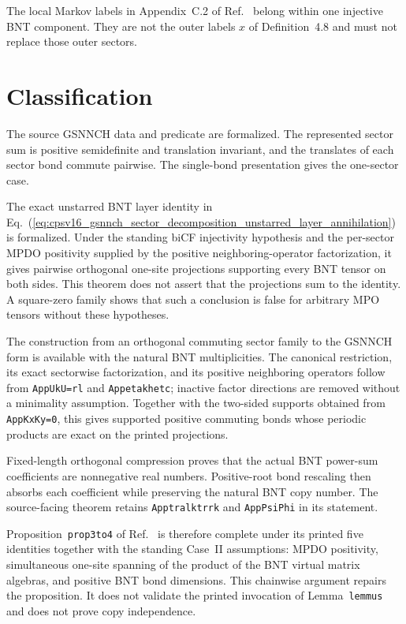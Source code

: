 \documentclass{article}
\begin{document}
The local Markov labels in Appendix~C.2 of
Ref.~\cite{Cirac2016MPDO_arXiv} belong within one injective BNT component.
They are not the outer labels $x$ of Definition~4.8 and must not replace those
outer sectors.

\section{Classification}

The source GSNNCH data and predicate are formalized. The represented sector
sum is positive semidefinite and translation invariant, and the translates
of each sector bond commute pairwise. The single-bond presentation gives the
one-sector case.

The exact unstarred BNT layer identity in
Eq.~(\ref{eq:cpsv16_gsnnch_sector_decomposition_unstarred_layer_annihilation})
is formalized. Under the standing biCF injectivity hypothesis and the
per-sector MPDO positivity supplied by the positive neighboring-operator
factorization, it gives pairwise orthogonal one-site projections supporting
every BNT tensor on both sides. This theorem does not assert that the
projections sum to the identity. A square-zero family shows that such a
conclusion is false for arbitrary MPO tensors without these hypotheses.

The construction from an orthogonal commuting sector family to the GSNNCH
form is available with the natural BNT multiplicities. The canonical
restriction, its exact sectorwise factorization, and its positive neighboring
operators follow from \texttt{AppUkU=rl} and \texttt{Appetakhetc}; inactive
factor directions are removed without a minimality assumption. Together with
the two-sided supports obtained from \texttt{AppKxKy=0}, this gives supported
positive commuting bonds whose periodic products are exact on the printed
projections.

Fixed-length orthogonal compression proves that the actual BNT power-sum
coefficients are nonnegative real numbers. Positive-root bond rescaling then
absorbs each coefficient while preserving the natural BNT copy number. The
source-facing theorem retains \texttt{Apptralktrrk} and \texttt{AppPsiPhi} in
its statement.

Proposition~\texttt{prop3to4} of Ref.~\cite{Cirac2016MPDO_arXiv} is therefore
complete under its printed five identities together with the standing Case~II
assumptions: MPDO positivity, simultaneous one-site spanning of the product of
the BNT virtual matrix algebras, and positive BNT bond dimensions. This
chainwise argument repairs the proposition. It does not validate the printed
invocation of Lemma~\texttt{lemmus} and does not prove copy independence.



\end{document}
